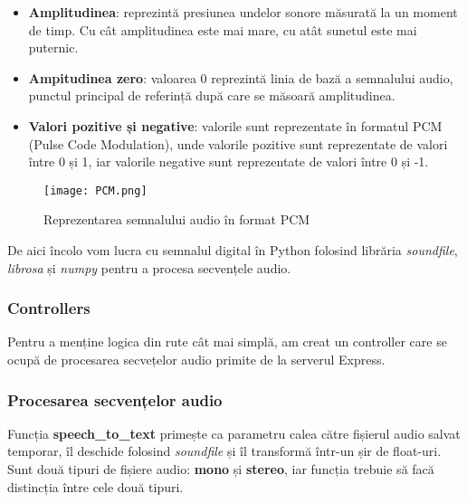 \begin{itemize}
    \item \textbf{Amplitudinea}: reprezintă presiunea undelor sonore măsurată la un moment de timp.
    Cu cât amplitudinea este mai mare, cu atât sunetul este mai puternic.
    \item \textbf{Ampitudinea zero}: valoarea 0 reprezintă linia de bază a semnalului audio, punctul
    principal de referință după care se măsoară amplitudinea.
    \item \textbf{Valori pozitive și negative}: valorile sunt reprezentate în formatul PCM (Pulse Code Modulation),
    unde valorile pozitive sunt reprezentate de valori între 0 și 1, iar valorile negative sunt reprezentate
    de valori între 0 și -1.
\end{itemize}

\begin{figure}[h]
    \centering
    \texttt{[image: PCM.png]}
    \caption{Reprezentarea semnalului audio în format PCM\protect\footnotemark[2]}
    \label{fig:pcm}
\end{figure}

\par
De aici încolo vom lucra cu semnalul digital în Python folosind librăria \textit{soundfile},
\textit{librosa} și \textit{numpy} pentru a procesa secvențele audio.


\subsubsection{Controllers}
Pentru a menține logica din rute cât mai simplă, am creat un controller care se ocupă de procesarea
secvețelor audio primite de la serverul Express. 

\subsubsection{Procesarea secvențelor audio}
\par
Funcția \textbf{speech\_to\_text} primește ca parametru calea către fișierul audio salvat temporar,
îl deschide folosind \textit{soundfile} și îl transformă într-un șir de float-uri.
Sunt două tipuri de fișiere audio: \textbf{mono} și \textbf{stereo}, iar funcția trebuie să facă distincția
între cele două tipuri. 


